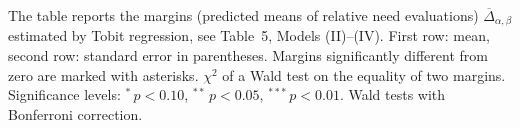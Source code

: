 \documentclass[10pt,letterpaper]{article}
\begin{document}
\begin{table}[ht!]
\begin{adjustwidth}{-1in}{0in}
{\begin{tabular}{cd{4.1}cd{4.1}cc}
\end{tabular}}
\begin{flushleft}  
   The table reports the margins (predicted means of relative need evaluations) $\overline{\Delta}_{\alpha,\beta}$ estimated by Tobit regression, see Table~5, Models (II)--(IV). First row: mean, second row: standard error in parentheses. Margins significantly different from zero are marked with asterisks. $\chi^2$ of a Wald test on the equality of two margins. Significance levels: $^{*}$\,$p<0.10$, $^{**}$\,$p<0.05$, $^{***}$\,$p<0.01$. Wald tests with Bonferroni correction.
\end{flushleft}
\end{adjustwidth}
\end{table}
\end{document}
